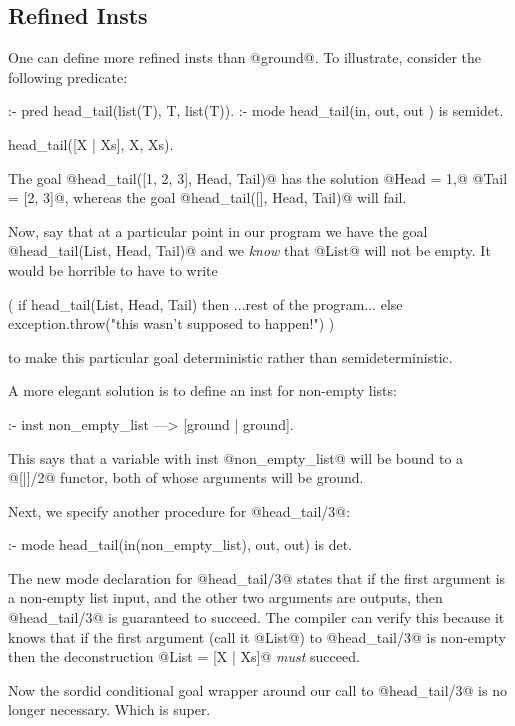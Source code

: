 \subsection{Refined Insts}

One can define more refined insts than @ground@.  To illustrate,
consider the following predicate:
\begin{myverbatim}
:- pred head_tail(list(T), T,   list(T)).
:- mode head_tail(in,      out, out    ) is semidet.

head_tail([X | Xs], X, Xs).
\end{myverbatim}
The goal @head_tail([1, 2, 3], Head, Tail)@ has the solution
@Head = 1,@ @Tail = [2, 3]@, whereas the goal
@head_tail([], Head, Tail)@ will fail.

Now, say that at a particular point in our program we have the goal
@head_tail(List, Head, Tail)@ and we \emph{know} that @List@ will not be
empty.  It would be horrible to have to write
\begin{myverbatim}
    ( if head_tail(List, Head, Tail) then
        ...rest of the program...
      else
        exception.throw("this wasn't supposed to happen!")
    )
\end{myverbatim}
to make this particular goal deterministic rather than
semideterministic.

A more elegant solution is to define an inst for non-empty lists:
\begin{myverbatim}
:- inst non_empty_list ---> [ground | ground].
\end{myverbatim}
This says that a variable with inst @non_empty_list@ will be bound to
a @[|]/2@ functor, both of whose arguments will be ground.

Next, we specify another procedure for @head_tail/3@:
\begin{myverbatim}
:- mode head_tail(in(non_empty_list), out, out) is det.
\end{myverbatim}

The new mode declaration for @head_tail/3@ states
that if the first argument is a non-empty list input, and the other two
arguments are outputs, then @head_tail/3@ is guaranteed to succeed.  The
compiler can verify this because it knows that if the first argument
(call it @List@) to @head_tail/3@ is non-empty then the deconstruction
@List = [X | Xs]@ \emph{must} succeed.

Now the sordid conditional goal wrapper around our
call to @head_tail/3@ is no longer necessary.  Which is super.

